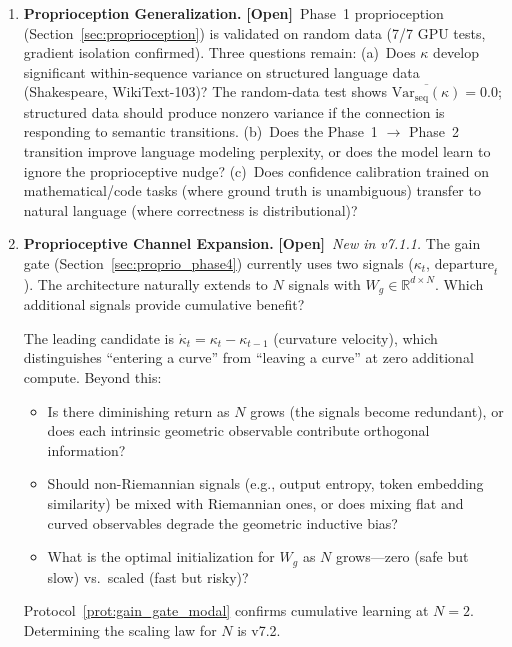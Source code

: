 \documentclass[11pt,a4paper]{article}
\theoremstyle{definition}
\theoremstyle{remark}
\newcommand{\statusopen}{\textcolor{red!70!black}{\textbf{[Open]}}}
\begin{document}
\begin{enumerate}[label=\textbf{OP\arabic*.},leftmargin=2.5em]
    Two independent runs with identical hyperparameters converged to
    PPL 37.11 vs.\ 37.15 ($\Delta = 0.034$), demonstrating high
    reproducibility.
    
    The geometric advantage on natural language vs.\ a PE-enabled
    transformer is \textbf{established}.
    
    \item \textbf{Proprioception Generalization.} \statusopen\ 
    Phase~1 proprioception (Section~\ref{sec:proprioception}) is 
    validated on random data (7/7 GPU tests, gradient isolation 
    confirmed). Three questions remain: (a)~Does $\kappa$ develop 
    significant within-sequence variance on structured language data 
    (Shakespeare, WikiText-103)? The random-data test shows 
    $\overline{\mathrm{Var}_{\mathrm{seq}}(\kappa)} = 0.0$; 
    structured data should produce nonzero variance if the connection 
    is responding to semantic transitions. (b)~Does the Phase~1 
    $\to$ Phase~2 transition improve language modeling perplexity, 
    or does the model learn to ignore the proprioceptive nudge? 
    (c)~Does confidence calibration trained on mathematical/code 
    tasks (where ground truth is unambiguous) transfer to natural 
    language (where correctness is distributional)?
    
    \item \textbf{Proprioceptive Channel Expansion.} \statusopen\ 
    \emph{New in v7.1.1.} The gain gate 
    (Section~\ref{sec:proprio_phase4}) currently uses two signals 
    ($\kappa_t$, $\mathrm{departure}_t$). The architecture naturally 
    extends to $N$ signals with $W_g \in \mathbb{R}^{d \times N}$. 
    Which additional signals provide cumulative benefit?
    
    The leading candidate is $\dot{\kappa}_t = \kappa_t - \kappa_{t-1}$ 
    (curvature velocity), which distinguishes ``entering a curve'' 
    from ``leaving a curve'' at zero additional compute. Beyond this:
    \begin{itemize}[nosep]
        \item Is there diminishing return as $N$ grows (the signals 
        become redundant), or does each intrinsic geometric observable 
        contribute orthogonal information?
        \item Should non-Riemannian signals (e.g., output entropy, 
        token embedding similarity) be mixed with Riemannian ones, 
        or does mixing flat and curved observables degrade the 
        geometric inductive bias?
        \item What is the optimal initialization for $W_g$ as $N$ 
        grows---zero (safe but slow) vs.\ scaled (fast but risky)?
    \end{itemize}
    Protocol~\ref{prot:gain_gate_modal} confirms cumulative learning 
    at $N = 2$. Determining the scaling law for $N$ is v7.2.
\end{enumerate}
\end{document}
